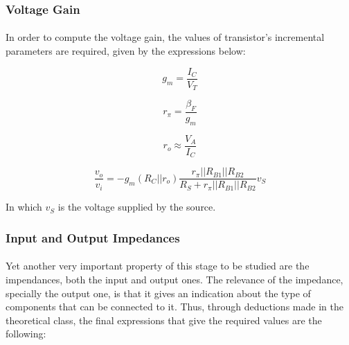 \subsubsection{Voltage Gain}


\paragraph{}In order to compute the voltage gain, the values of transistor's incremental parameters are required, given by the expressions below: 

\begin{equation}
    g_m=\frac{I_C}{V_T}
\end{equation}

\begin{equation}
    r_\pi=\frac{\beta_F}{g_m}
\end{equation}

\begin{equation}
    r_o\approx\frac{V_A}{I_C}
\end{equation}


\begin{equation}
    \frac{v_o}{v_i}=-g_m(R_C||r_o)\frac{r_\pi||R_{B1}||R_{B2}}{R_S+r_\pi||R_{B1}||R_{B2}}v_S
\end{equation}

In which $v_S$ is the voltage supplied by the source. 



\subsubsection{Input and Output Impedances}

\paragraph{}Yet another very important property of this stage to be studied are the impendances, both the input and output ones. The relevance of the impedance, specially the output one, is that it gives an indication about the type of components that can be connected to it. Thus, through deductions made in the theoretical class, the final expressions that give the required values are the following:




